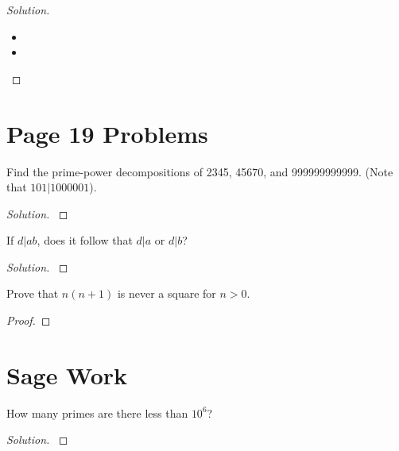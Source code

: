 \documentclass[11pt]{article}
\newenvironment{problem}[2][Problem]{\begin{trivlist}
\item[\hskip \labelsep {\bfseries #1}\hskip \labelsep {\bfseries #2.}]}{\end{trivlist}}
\newenvironment{solution}
  {\renewcommand\qedsymbol{$~$}\begin{proof}[Solution]$ $\par\nobreak\ignorespaces}
  {\end{proof}}
\begin{document}
\begin{solution}
\begin{itemize}
    \item [(a)]
    \item [(b)]
\end{itemize}
\end{solution}



\section{Page 19 Problems}



\begin{problem}{2} 
Find the prime-power decompositions of 2345, 45670, and 999999999999. (Note that $101|1000001$). 
\end{problem}

\begin{solution}

\end{solution}



\begin{problem}{8} 
If $d|ab$, does it follow that $d|a$ or $d|b$? 
\end{problem}

\begin{solution}

\end{solution}



\begin{problem}{10} 
Prove that $n(n+1)$ is never a square for $n>0$. 
\end{problem}

\begin{proof}

\end{proof}



\section{Sage Work}


\begin{problem}{A} 
How many primes are there less than $10^6$?
\end{problem}

\begin{solution}


%
\end{solution}
\end{document}
